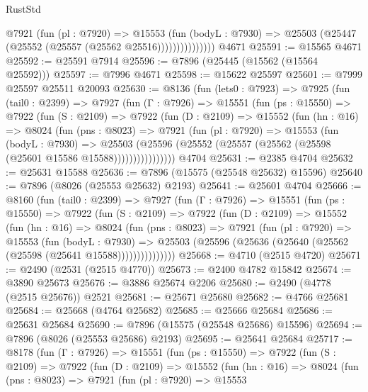\begin{lexlean}{RustStd}
\begin{coremodule}
                    @7921
                      (fun (pl : @7920) =>
                      @15553
                        (fun (bodyL : @7930) =>
                        @25503 (@25447 (@25552 (@25557 (@25562 @25516)))))))))))))))
    @4671
@25591 := @15565 @4671
@25592 := @25591 @7914
@25596 := @7896 (@25445 (@15562 (@15564 @25592)))
@25597 := @7996 @4671
@25598 := @15622 @25597
@25601 := @7999 @25597 @25511 @20093
@25630 := @8136
    (fun (lets0 : @7923) =>
    @7925
      (fun (tail0 : @2399) =>
      @7927
        (fun (Γ : @7926) =>
        @15551
          (fun (ps : @15550) =>
          @7922
            (fun (S : @2109) =>
            @7922
              (fun (D : @2109) =>
              @15552
                (fun (hn : @16) =>
                @8024
                  (fun (pns : @8023) =>
                  @7921
                    (fun (pl : @7920) =>
                    @15553
                      (fun (bodyL : @7930) =>
                      @25503
                        (@25596
                          (@25552 (@25557 (@25562 (@25598 (@25601 @15586 @15588))))))))))))))))
    @4704
@25631 := @2385 @4704
@25632 := @25631 @15588
@25636 := @7896 (@15575 (@25548 @25632) @15596)
@25640 := @7896 (@8026 (@25553 @25632) @2193)
@25641 := @25601 @4704
@25666 := @8160
    (fun (tail0 : @2399) =>
    @7927
      (fun (Γ : @7926) =>
      @15551
        (fun (ps : @15550) =>
        @7922
          (fun (S : @2109) =>
          @7922
            (fun (D : @2109) =>
            @15552
              (fun (hn : @16) =>
              @8024
                (fun (pns : @8023) =>
                @7921
                  (fun (pl : @7920) =>
                  @15553
                    (fun (bodyL : @7930) =>
                    @25503 (@25596 (@25636 (@25640 (@25562 (@25598 (@25641 @15588)))))))))))))))
@25668 := @4710 (@2515 @4720)
@25671 := @2490 (@2531 (@2515 @4770))
@25673 := @2400 @4782 @15842
@25674 := @3890 @25673
@25676 := @3886 @25674 @2206
@25680 := @2490 (@4778 (@2515 @25676)) @2521
@25681 := @25671 @25680
@25682 := @4766 @25681
@25684 := @25668 (@4764 @25682)
@25685 := @25666 @25684
@25686 := @25631 @25684
@25690 := @7896 (@15575 (@25548 @25686) @15596)
@25694 := @7896 (@8026 (@25553 @25686) @2193)
@25695 := @25641 @25684
@25717 := @8178
    (fun (Γ : @7926) =>
    @15551
      (fun (ps : @15550) =>
      @7922
        (fun (S : @2109) =>
        @7922
          (fun (D : @2109) =>
          @15552
            (fun (hn : @16) =>
            @8024
              (fun (pns : @8023) =>
              @7921
                (fun (pl : @7920) =>
                @15553

\end{coremodule}
\end{lexlean}

